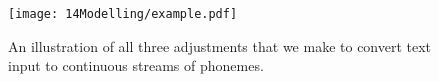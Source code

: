 \begin{figure}[t]
    \centering
    \texttt{[image: 14Modelling/example.pdf]}
    \caption{An illustration of all three adjustments that we make to convert text input to continuous streams of phonemes.}
    \label{fix:14-example}
    \vspace{-6mm}
\end{figure}







